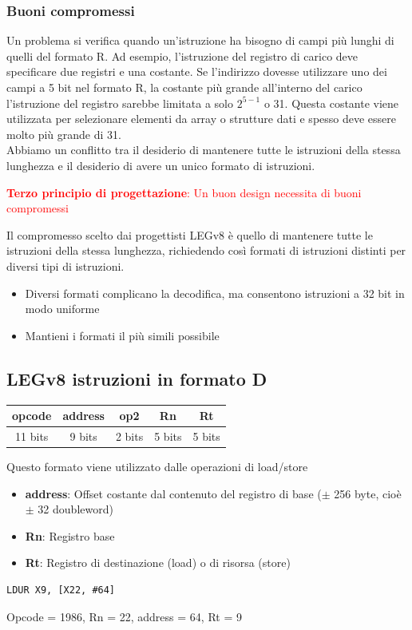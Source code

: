 \documentclass[12pt,a4paper]{article}
\begin{document}
\subsubsection{Buoni compromessi}
Un problema si verifica quando un'istruzione ha bisogno di campi più lunghi di quelli del formato R. Ad esempio, l'istruzione del registro di carico deve specificare due registri e una costante. Se l'indirizzo dovesse utilizzare uno dei campi a 5 bit nel formato R, la costante più grande all'interno del carico l'istruzione del registro sarebbe limitata a solo $2^{5-1}$ o 31.
Questa costante viene utilizzata per selezionare elementi da array o strutture dati e spesso deve essere molto più grande di 31.\\
Abbiamo un conflitto tra il desiderio di mantenere tutte le istruzioni della stessa lunghezza e il desiderio di avere un unico formato di istruzioni.
\begin{center}\textcolor{red}{\textbf{Terzo principio di progettazione}: Un buon design necessita di buoni compromessi}\end{center}
Il compromesso scelto dai progettisti LEGv8 è quello di mantenere tutte le istruzioni della stessa lunghezza, richiedendo così formati di istruzioni distinti per diversi tipi di istruzioni.
\begin{itemize}
\item Diversi formati complicano la decodifica, ma consentono istruzioni a 32 bit in modo uniforme
\item Mantieni i formati il più simili possibile
\end{itemize}

\subsection{LEGv8 istruzioni in formato D}
\Sep
\begin{center}\begin{tabular}{ccccc}
\hline
\multicolumn{1}{|c|}{opcode} & \multicolumn{1}{c|}{address} & \multicolumn{1}{c|}{op2} & \multicolumn{1}{c|}{Rn} & \multicolumn{1}{c|}{Rt} \\ \hline
11 bits & 9 bits & 2 bits & 5 bits & 5 bits                     
\end{tabular}\end{center}
Questo formato viene utilizzato dalle operazioni di load/store
\begin{itemize}
\item \textbf{address}: Offset costante dal contenuto del registro di base ($\pm$ 256 byte, cioè $\pm$ 32 doubleword)
\item \textbf{Rn}: Registro base
\item \textbf{Rt}: Registro di destinazione (load) o di risorsa (store)
\end{itemize}
\begin{center}
\begin{minipage}{.4\linewidth}
\begin{verbatim}
LDUR X9, [X22, #64]
\end{verbatim}
\end{minipage}
\end{center}
Opcode = 1986, Rn = 22, address = 64, Rt = 9
\end{document}
